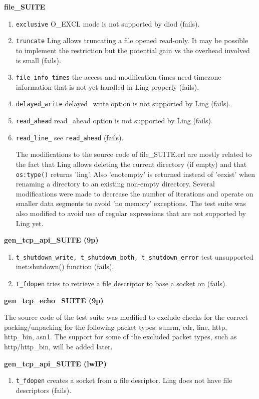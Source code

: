 \documentclass{article}
\begin{document}
\textbf{file\_SUITE}
\begin{enumerate}
\item \texttt{exclusive} O\_EXCL mode is not supported by diod (fails).
\item \texttt{truncate} Ling allows truncating a file opened read-only. It may
be possible to implement the restriction but the potential gain vs the overhead
involved is small (fails).
\item \texttt{file\_info\_times} the access and modification times need timezone
information that is not yet handled in Ling properly (fails).
\item \texttt{delayed\_write} delayed\_write option is not supported by Ling
(fails).
\item \texttt{read\_ahead} read\_ahead option is not supported by Ling (fails).
\item \texttt{read\_line\_} see \texttt{read\_ahead} (fails).

The modifications to the source code of file\_SUITE.erl are mostly related to
the fact that Ling allows deleting the current directory (if empty) and that
\verb$os:type()$ returns 'ling'. Also 'enotempty' is returned instead of
'eexist' when renaming a directory to an existing non-empty directory. Several
modifications were made to decrease the number of iterations and operate on smaller data
segments to avoid 'no memory' exceptions. The test suite was also modified to
avoid use of regular expressions that are not supported by Ling yet.

\end{enumerate}

\textbf{gen\_tcp\_api\_SUITE (9p)}
\begin{enumerate}
\item \texttt{t\_shutdown\_write, t\_shutdown\_both, t\_shutdown\_error} test
unsupported inet:shutdown() function (fails).
\item \texttt{t\_fdopen} tries to retrieve a file descriptor to base a socket on
(fails).
\end{enumerate}

\textbf{gen\_tcp\_echo\_SUITE (9p)}

The source code of the test suite was modified to exclude checks for the correct
packing/unpacking for the following packet types: sunrm, cdr, line, http,
http\_bin, asn1. The support for some of the excluded packet types, such as
http/http\_bin, will be added later.

\textbf{gen\_tcp\_api\_SUITE (lwIP)}
\begin{enumerate}
\item \texttt{t\_fdopen} creates a socket from a file desriptor. Ling does not
have file descriptors (fails).
\end{enumerate}
\end{document}
